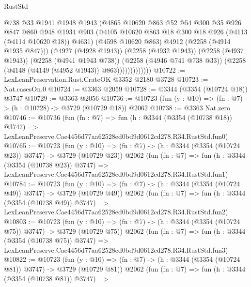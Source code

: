 \begin{lexlean}{RustStd}
\begin{coremodule}
                          @738
                          @33
                          @1941
                          @1948
                          @1943
                          (@4865
                            @10620
                            @863
                            @52
                            @54
                            @300
                            @35
                            @926
                            @847
                            @860
                            @948
                            @1934
                            @903
                            (@4105 @10620 @863 @18 @300 @18 @926 (@4113 (@4114 @10620 @18)) @4631)
                            (@4598 @10620 @863)
                            @4912
                            (@2258 (@4914 @1935 @847)))
                          (@4927 (@4928 @1943))
                          (@2258 (@4932 @1943))
                          (@2258 (@4937 @1943))
                          (@2258 (@4941 @1943 @738))
                          (@2258 (@4946 @741 @738 @33))
                          (@2258 (@4148 (@4149 (@4952 @1943)) @863)))))))))))))
@10722 := LexLeanPreservation.Rust.CrateOK @3352 @2180 @3728
@10723 := Nat.casesOn.{0}
@10724 := @3363 @2059
@10728 := @3344 (@3354 (@10724 @18)) @3747
@10729 := @3363 @2056
@10736 := @10723 (fun (y : @10) => (fn : @7) -> (h : @10728) -> @3729 (@10729 @18)) @2062
@10738 := @3363 Nat.zero
@10746 := @10736
    (fun (fn : @7) =>
    fun (h : @3344 (@3354 (@10738 @18)) @3747) =>
    LexLeanPreserve.Cae4456d77aa62528ed0bd9d0612cd278.R34.RustStd.fun0)
@10765 := @10723
    (fun (y : @10) => (fn : @7) -> (h : @3344 (@3354 (@10724 @23)) @3747) -> @3729 (@10729 @23))
    @2062
    (fun (fn : @7) =>
    fun (h : @3344 (@3354 (@10738 @23)) @3747) =>
    LexLeanPreserve.Cae4456d77aa62528ed0bd9d0612cd278.R34.RustStd.fun1)
@10784 := @10723
    (fun (y : @10) => (fn : @7) -> (h : @3344 (@3354 (@10724 @49)) @3747) -> @3729 (@10729 @49))
    @2062
    (fun (fn : @7) =>
    fun (h : @3344 (@3354 (@10738 @49)) @3747) =>
    LexLeanPreserve.Cae4456d77aa62528ed0bd9d0612cd278.R34.RustStd.fun2)
@10803 := @10723
    (fun (y : @10) => (fn : @7) -> (h : @3344 (@3354 (@10724 @75)) @3747) -> @3729 (@10729 @75))
    @2062
    (fun (fn : @7) =>
    fun (h : @3344 (@3354 (@10738 @75)) @3747) =>
    LexLeanPreserve.Cae4456d77aa62528ed0bd9d0612cd278.R34.RustStd.fun3)
@10822 := @10723
    (fun (y : @10) => (fn : @7) -> (h : @3344 (@3354 (@10724 @81)) @3747) -> @3729 (@10729 @81))
    @2062
    (fun (fn : @7) =>
    fun (h : @3344 (@3354 (@10738 @81)) @3747) =>

\end{coremodule}
\end{lexlean}
